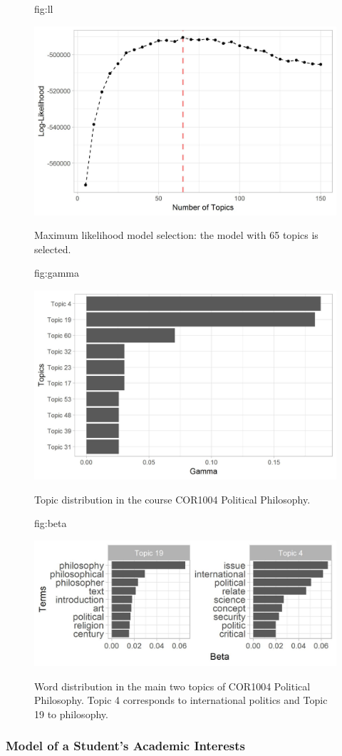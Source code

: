 \documentclass[pmlr]{jmlr}%
\begin{document}
\begin{figure}[htbp]
	\floatconts
	{fig:ll}
	{\caption{Maximum likelihood model selection: the model with 65 topics is selected.}}
	{\includegraphics[width=0.5\linewidth]{figures/model-selection}}
\end{figure}

\begin{figure}[htbp]
	\floatconts
	{fig:gamma}
	{\caption{Topic distribution in the course COR1004 Political Philosophy.}}
	{\includegraphics[width=0.5\linewidth]{figures/gamma-COR1004}}
\end{figure}

\begin{figure}[htbp]
	\floatconts
	{fig:beta}
	{\caption{Word distribution in the main two topics of COR1004 Political Philosophy. Topic 4 corresponds to international politics and Topic 19 to philosophy.}}
	{\includegraphics[width=0.75\linewidth]{figures/beta}}
\end{figure}

\subsubsection{Model of a Student's Academic Interests}
\end{document}
